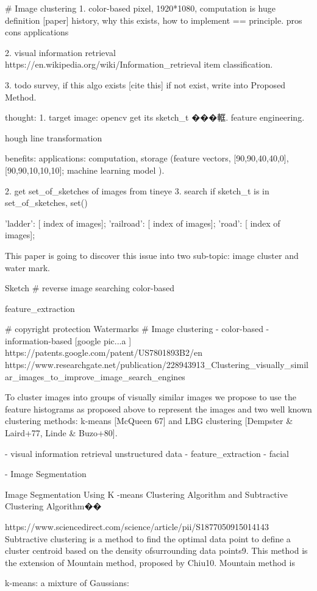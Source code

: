 # Image clustering
1. color-based pixel, 1920*1080, computation is huge
definition [paper] \cite{}
history, why this exists, 
how to implement == principle.
pros cons
applications

2. visual information retrieval
https://en.wikipedia.org/wiki/Information_retrieval
item classification.


3. todo survey, if this algo exists [cite this]
if not exist, write into Proposed Method.

thought:
1. target image: opencv get its sketch_t ���軭.  feature engineering.

hough line transformation

benefits:
applications:
computation, storage (feature vectors, [90,90,40,40,0], [90,90,10,10,10];
        machine learning model ).

2. get set_of_sketches of images from tineye
3. search if sketch_t is in set_of_sketches, set()

{
'ladder': [ index of images];
'railroad': [ index of images];
'road': [ index of images];
}

This paper is going to discover this issue into two sub-topic: image cluster and water mark.

Sketch
# reverse image searching
    color-based

    feature_extraction   

# copyright protection
    Watermarks  
# Image clustering
    - color-based
    - information-based [google pic...a ]
    https://patents.google.com/patent/US7801893B2/en  
    https://www.researchgate.net/publication/228943913_Clustering_visually_similar_images_to_improve_image_search_engines  {

To cluster images into groups of visually similar images we propose to use the feature histograms as proposed above to represent the images and two well known clustering methods: k-means [McQueen 67] and LBG clustering [Dempster & Laird+77, Linde & Buzo+80]. 
    }
        - visual information retrieval
         unstructured data
        - feature_extraction   
        - facial 

        - Image Segmentation  

Image Segmentation Using K -means Clustering Algorithm and Subtractive Clustering Algorithm��{
https://www.sciencedirect.com/science/article/pii/S1877050915014143
Subtractive clustering is a method to find the optimal data point to define a cluster centroid based on the density ofsurrounding data points9. This method is the extension of Mountain method, proposed by Chiu10. Mountain method is

}

k-means: 
a mixture of Gaussians: 


